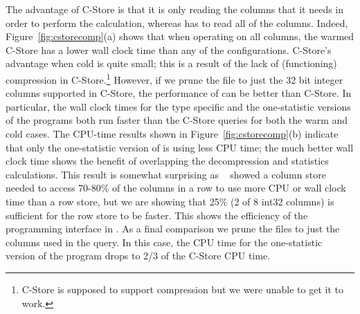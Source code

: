 The advantage of C-Store is that it is only reading the columns that
it needs in order to perform the calculation, whereas \DataSeries{}
has to read all of the columns.  Indeed,
Figure~\ref{fig:cstorecomp}(a) shows that when operating on all
columns, the warmed C-Store has a lower wall clock time
than any of the \DataSeries{} configurations.
C-Store's advantage when cold is quite small; this is a result of the
lack of (functioning) compression in C-Store.\footnote{C-Store is supposed to support
compression but we were unable to get it to work.}
However, if we
prune the \DataSeries{} file to just the 32 bit integer columns supported in
C-Store, the performance of \DataSeries{} can be better than C-Store.
In particular, the wall clock times for the type
specific and the one-statistic versions of the \DataSeries{} programs
both run faster than the C-Store queries for both the warm and cold
cases.  The CPU-time results shown in Figure~\ref{fig:cstorecomp}(b)
indicate that only the one-statistic version
of \DataSeries{} is using less CPU time; the much better wall clock time
shows the benefit of overlapping the decompression and statistics
calculations.  This result is somewhat surprising as
~\cite{VLDBCstoreTradeoffs} showed a column store needed to access
70-80\% of the columns in a row to use more CPU or wall clock time
than a row store, but we are showing that 25\% (2 of 8 int32 columns)
is sufficient for the row store to be faster.  This shows the
efficiency of the programming interface in \DataSeries{}.  As a
final comparison we
prune the files to just the columns used in the query.
In this case, the CPU time
for the one-statistic version of the \DataSeries{} program drops to
2/3 of the C-Store CPU time.


